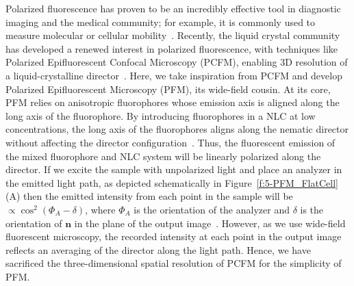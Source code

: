 Polarized fluorescence has proven to be an incredibly effective tool in diagnostic imaging and the medical community; for example, it is commonly used to measure molecular or cellular mobility~\cite{RN282,RN284}.
Recently, the liquid crystal community has developed a renewed interest in polarized fluorescence, with techniques like Polarized Epifluorescent Confocal Microscopy (PCFM), enabling 3D resolution of a liquid-crystalline director~\cite{RN148,RN174}.
Here, we take inspiration from PCFM and develop Polarized Epifluorescent Microscopy (PFM), its wide-field cousin.
At its core, PFM relies on anisotropic fluorophores whose emission axis is aligned along the long axis of the fluorophore.
By introducing fluorophores in a NLC at low concentrations, the long axis of the fluorophores aligns along the nematic director without affecting the director configuration~\cite{RN148,RN174}.
Thus, the fluorescent emission of the mixed fluorophore and NLC system will be linearly polarized along the director.
If we excite the sample with unpolarized light and place an analyzer in the emitted light path, as depicted schematically in Figure~\ref{f:5-PFM_FlatCell}(A) then the emitted intensity from each point in the sample will be $\propto \cos^2{(\Phi_A-\delta)}$, where $\Phi_A$ is the orientation of the analyzer and $\delta$ is the orientation of $\mathbf{n}$ in the plane of the output image~\cite{RN174}.
However, as we use wide-field fluorescent microscopy, the recorded intensity at each point in the output image reflects an averaging of the director along the light path.
Hence, we have sacrificed the three-dimensional spatial resolution of PCFM for the simplicity of PFM.
